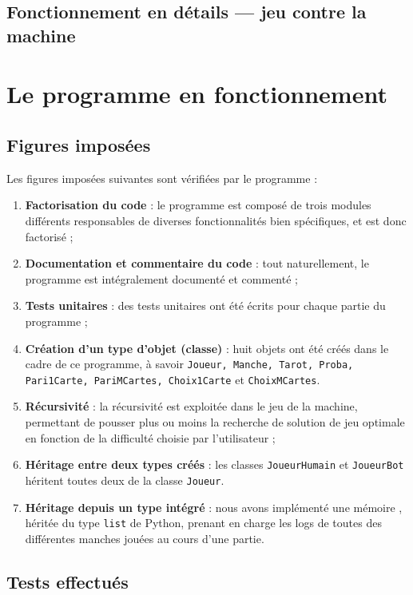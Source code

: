    \subsection{Fonctionnement en détails --- jeu contre la machine}


\section{Le programme en fonctionnement}

   \subsection{Figures imposées}\label{subsec:figures-imposées}
      Les figures imposées suivantes sont vérifiées par le programme :
      \begin{enumerate}
         \item \textbf{Factorisation du code} : le programme est composé de trois modules différents responsables de diverses fonctionnalités bien spécifiques, et est donc factorisé ;
         \item \textbf{Documentation et commentaire du code} : tout naturellement, le programme est intégralement documenté et commenté ;
         \item \textbf{Tests unitaires} : des tests unitaires ont été écrits pour chaque partie du programme ;
         \item \textbf{Création d'un type d'objet (classe)} : huit objets ont été créés dans le cadre de ce programme, à savoir \texttt{Joueur, Manche, Tarot, Proba, Pari1Carte, PariMCartes, Choix1Carte} et \texttt{ChoixMCartes}.
         \item \textbf{Récursivité} : la récursivité est exploitée dans le jeu de la machine, permettant de pousser plus ou moins la recherche de solution de jeu optimale en fonction de la difficulté choisie par l'utilisateur ;
         \item \textbf{Héritage entre deux types créés} : les classes \texttt{JoueurHumain} et \texttt{JoueurBot} héritent toutes deux de la classe \texttt{Joueur}.
         \item \textbf{Héritage depuis un type intégré} : nous avons implémenté une \og mémoire \fg{}, héritée du type \texttt{list} de Python, prenant en charge les logs de toutes des différentes manches jouées au cours d'une partie.
      \end{enumerate}

   \subsection{Tests effectués}
   
